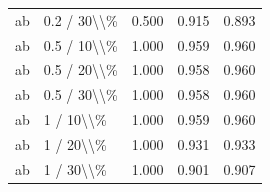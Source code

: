 \begin{table}[!h]
\begin{tabular}[t]{llccc}
\addlinespace
ab & 0.2 / 30\textbackslash{}\textbackslash{}\% & 0.500 & 0.915 & 0.893\\
ab & 0.5 / 10\textbackslash{}\textbackslash{}\% & 1.000 & 0.959 & 0.960\\
ab & 0.5 / 20\textbackslash{}\textbackslash{}\% & 1.000 & 0.958 & 0.960\\
ab & 0.5 / 30\textbackslash{}\textbackslash{}\% & 1.000 & 0.958 & 0.960\\
ab & 1 / 10\textbackslash{}\textbackslash{}\% & 1.000 & 0.959 & 0.960\\
\addlinespace
ab & 1 / 20\textbackslash{}\textbackslash{}\% & 1.000 & 0.931 & 0.933\\
ab & 1 / 30\textbackslash{}\textbackslash{}\% & 1.000 & 0.901 & 0.907\\
\bottomrule
\end{tabular}
\end{table}
